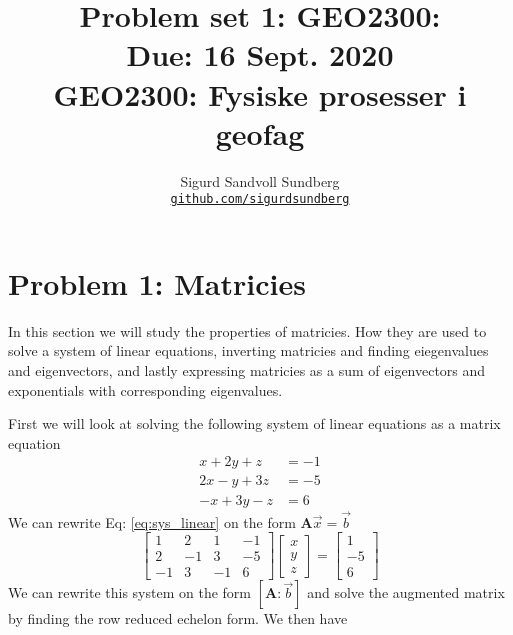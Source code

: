 \documentclass[10pt, a4paper]{amsart}
\title[Problem set 1]{Problem set 1: GEO2300: \\
\normalsize{Due: 16 Sept. 2020} \\
  \hrulefill\small{ GEO2300: Fysiske prosesser i geofag }\hrulefill}
\author[Sundberg]{Sigurd Sandvoll Sundberg \\
  \href{https://https://github.com/SigurdSundberg/GEO2300/}{\texttt{github.com/sigurdsundberg}}}
\begin{document}
\begin{titlepage}
\maketitle
\tableofcontents
\end{titlepage}

\section{Problem 1: Matricies}
In this section we will study the properties of matricies. How they are used to solve a system of linear equations, inverting matricies and finding eiegenvalues and eigenvectors, and lastly expressing matricies as a sum of eigenvectors and exponentials with corresponding eigenvalues. 

First we will look at solving the following system of linear equations as a matrix equation
\begin{equation}\label{eq:sys_linear}
\begin{split}
	x + 2y + z &= -1\\
	2x - y + 3z &= -5 \\
	-x + 3y- z &= 6
\end{split}
\end{equation}
We can rewrite Eq: \ref{eq:sys_linear} on the form $\mathbf{A}\vec{x} = \vec{b}$
\begin{equation}
	\begin{bmatrix}
		1 & 2 & 1 & -1\\
		2 & -1 & 3 & -5 \\
		-1 & 3 & -1 & 6
	\end{bmatrix}
	\begin{bmatrix}
	x\\y\\z
	\end{bmatrix}
	=
	\begin{bmatrix}
	1\\-5\\6
	\end{bmatrix}
\end{equation}
We can rewrite this system on the form $[\mathbf{A} : \vec{b}]$ and solve the augmented matrix by finding the row reduced echelon form. We then have 
\end{document}
